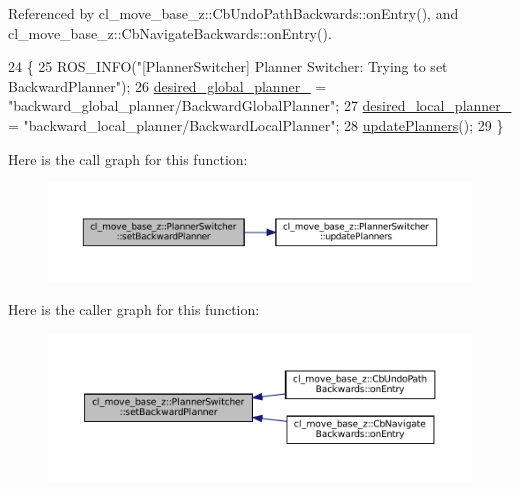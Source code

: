 Referenced by cl\+\_\+move\+\_\+base\+\_\+z\+::\+Cb\+Undo\+Path\+Backwards\+::on\+Entry(), and cl\+\_\+move\+\_\+base\+\_\+z\+::\+Cb\+Navigate\+Backwards\+::on\+Entry().


\begin{DoxyCode}
24 \{
25   ROS\_INFO(\textcolor{stringliteral}{"[PlannerSwitcher] Planner Switcher: Trying to set BackwardPlanner"});
26   \hyperlink{classcl__move__base__z_1_1PlannerSwitcher_aef047d3778b2993c1df146bbad43e03d}{desired\_global\_planner\_} = \textcolor{stringliteral}{"backward\_global\_planner/BackwardGlobalPlanner"};
27   \hyperlink{classcl__move__base__z_1_1PlannerSwitcher_a6cbf65f11bb69125f913caaabdf7b4cf}{desired\_local\_planner\_} = \textcolor{stringliteral}{"backward\_local\_planner/BackwardLocalPlanner"};
28   \hyperlink{classcl__move__base__z_1_1PlannerSwitcher_a146641f63aea3185daab4c5cbb789550}{updatePlanners}();
29 \}
\end{DoxyCode}
Here is the call graph for this function\+:
\nopagebreak
\begin{figure}[H]
\begin{center}
\leavevmode
\includegraphics[width=350pt]{classcl__move__base__z_1_1PlannerSwitcher_a6995deff44418a0965e4e793de8c4857_cgraph}
\end{center}
\end{figure}
Here is the caller graph for this function\+:
\nopagebreak
\begin{figure}[H]
\begin{center}
\leavevmode
\includegraphics[width=350pt]{classcl__move__base__z_1_1PlannerSwitcher_a6995deff44418a0965e4e793de8c4857_icgraph}
\end{center}
\end{figure}
\mbox{\label{classcl__move__base__z_1_1PlannerSwitcher_ad3f0d08a51af6218d203bf44a7f9df40}} 
